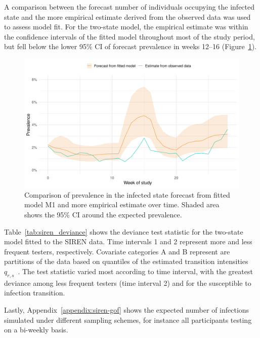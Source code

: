 A comparison between the forecast number of individuals occupying the infected state and the more empirical estimate derived from the observed data was used to assess model fit. For the two-state model, the empirical estimate was within the confidence intervals of the fitted model throughout most of the study period, but fell below the lower 95\% CI of forecast prevalence in weeks 12--16 (Figure~\ref{fig:model_diagnostics}).

\begin{figure}[htbp!]
    \centering
    \includegraphics[width=\textwidth]{model_diagnostics.pdf}
    \caption[Comparison of prevalence in the infected state forecast from fitted model and more empirical estimate over time]{Comparison of prevalence in the infected state forecast from fitted model M1 and more empirical estimate over time. Shaded area shows the 95\% CI around the expected prevalence.}\label{fig:model_diagnostics}
\end{figure}

Table~\ref{tab:siren_deviance} shows the deviance test statistic for the two-state model fitted to the SIREN data. Time intervals 1 and 2 represent more and less frequent testers, respectively. Covariate categories A and B represent are partitions of the data based on quantiles of the estimated transition intensities $q_{r,s}$~\parencite{Titman2009-nk}. The test statistic varied most according to time interval, with the greatest deviance among less frequent testers (time interval 2) and for the susceptible to infection transition.



Lastly, Appendix~\ref{appendix:siren-gof} shows the expected number of infections simulated under different sampling schemes, for instance all participants testing on a bi-weekly basis.

